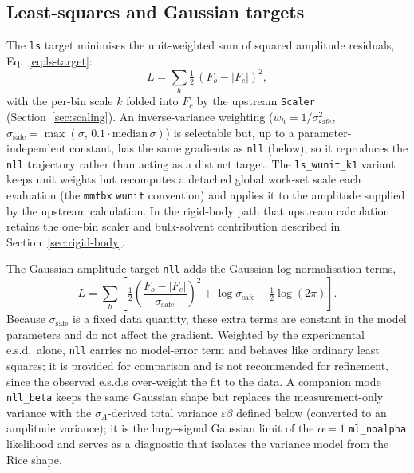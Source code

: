 \documentclass{iucrjournals}
\begin{document}
\subsection{Least-squares and Gaussian targets}

The \texttt{ls} target minimises the unit-weighted sum of squared amplitude
residuals, Eq.~\ref{eq:ls-target}:
%
\begin{equation}
  L = \sum_{h} \tfrac{1}{2}\,(F_{o} - |F_{c}|)^{2},
  \label{eq:ls-target}
\end{equation}
%
with the per-bin scale $k$ folded into $F_{c}$ by the upstream \texttt{Scaler}
(Section~\ref{sec:scaling}). An inverse-variance weighting
($w_{h} = 1/\sigma_\mathrm{safe}^{2}$, $\sigma_\mathrm{safe} =
\max(\sigma,\, 0.1\cdot\mathrm{median}\,\sigma)$) is selectable but, up to a
parameter-independent constant, has the same gradients as \texttt{nll} (below),
so it reproduces the \texttt{nll} trajectory rather than acting as a distinct
target. The \texttt{ls\_wunit\_k1} variant keeps unit weights but recomputes a
detached global work-set scale each evaluation (the \texttt{mmtbx} \texttt{wunit} convention)
and applies it to the amplitude supplied by the upstream calculation. In the
rigid-body path that upstream calculation retains the one-bin scaler and
bulk-solvent contribution described in Section~\ref{sec:rigid-body}.

The Gaussian amplitude target \texttt{nll} adds the Gaussian
log-normalisation terms,
%
\begin{equation}
  L = \sum_{h} \left[
    \tfrac{1}{2}\left(\frac{F_{o} - |F_{c}|}{\sigma_\mathrm{safe}}\right)^{2}
    + \log\sigma_\mathrm{safe}
    + \tfrac{1}{2}\log(2\pi)
  \right].
\end{equation}
%
Because $\sigma_\mathrm{safe}$ is a fixed data quantity, these extra terms are
constant in the model parameters and do not affect the gradient.  Weighted by the
experimental e.s.d.\ alone, \texttt{nll} carries no
model-error term and behaves like ordinary least squares; it is provided for
comparison and is not recommended for refinement, since the observed e.s.d.s
over-weight the fit to the data.  A companion mode \texttt{nll\_beta} keeps the
same Gaussian shape but replaces the measurement-only variance with the
$\sigma_A$-derived total variance $\varepsilon\beta$ defined below (converted to
an amplitude variance);
it is the large-signal Gaussian limit of the $\alpha=1$
\texttt{ml\_noalpha} likelihood and serves as a diagnostic that isolates the
variance model from the Rice shape.
\end{document}
